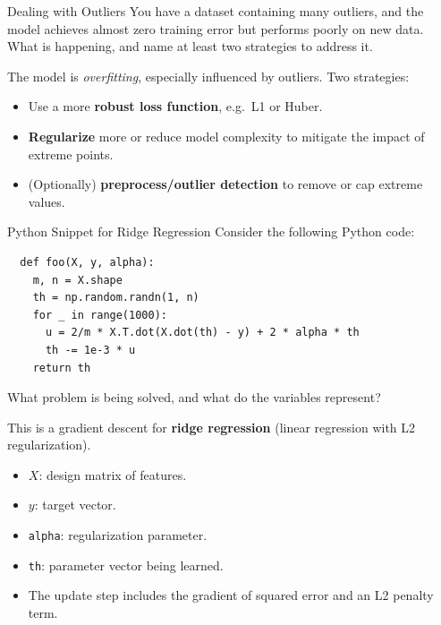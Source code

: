 \documentclass{article}
\begin{document}
\begin{exercise}{Dealing with Outliers}
  You have a dataset containing many outliers, and the model achieves almost zero training error but performs poorly on new data. What is happening, and name at least two strategies to address it.

  \begin{solution}
    The model is \emph{overfitting}, especially influenced by outliers.  
    Two strategies:
    \begin{itemize}
      \item Use a more \textbf{robust loss function}, e.g.\ L1 or Huber.
      \item \textbf{Regularize} more or reduce model complexity to mitigate the impact of extreme points.
      \item (Optionally) \textbf{preprocess/outlier detection} to remove or cap extreme values.
    \end{itemize}
  \end{solution}
\end{exercise}

\begin{exercise}{Python Snippet for Ridge Regression}
  Consider the following Python code:

  \begin{verbatim}
  def foo(X, y, alpha):
    m, n = X.shape
    th = np.random.randn(1, n)
    for _ in range(1000):
      u = 2/m * X.T.dot(X.dot(th) - y) + 2 * alpha * th
      th -= 1e-3 * u
    return th
  \end{verbatim}

  What problem is being solved, and what do the variables represent?

  \begin{solution}
    This is a gradient descent for \textbf{ridge regression} (linear regression with L2 regularization).  
    \begin{itemize}
      \item $X$: design matrix of features.
      \item $y$: target vector.
      \item \texttt{alpha}: regularization parameter.
      \item \texttt{th}: parameter vector being learned.
      \item The update step includes the gradient of squared error and an L2 penalty term.
    \end{itemize}
  \end{solution}
\end{exercise}
\end{document}
